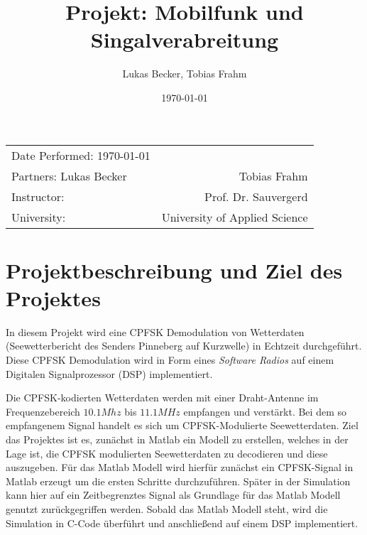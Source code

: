 \documentclass{article}
\title{Projekt: Mobilfunk und Singalverabreitung} %
\author{Lukas Becker, Tobias Frahm} %
\date{\today} %
\begin{document}
\maketitle %

\begin{center}
\begin{tabular}{l r}
Date Performed: \today \\ %
Partners: Lukas Becker & Tobias Frahm \\ %
Instructor: & Prof. Dr. Sauvergerd \\%
University: & University of Applied Science 
\end{tabular}
\end{center}

\begin{acronym}
\end{acronym}



\section{Projektbeschreibung und Ziel des Projektes}

In diesem Projekt wird eine \ac{CPFSK} Demodulation von Wetterdaten 
(Seewetterbericht des  Senders  Pinneberg  auf  Kurzwelle)  in  Echtzeit  durchgeführt. 
Diese  \ac{CPFSK} Demodulation  wird  in  Form  eines  \textit{Software  Radios}  auf  einem  
Digitalen Signalprozessor (DSP) implementiert. 

Die \ac{CPFSK}-kodierten Wetterdaten werden mit einer Draht-Antenne im Frequenzebereich
$10.1Mhz$ bis $11.1MHz$ empfangen und verstärkt. Bei dem so empfangenem Signal handelt es sich um 
\ac{CPFSK}-Modulierte Seewetterdaten. Ziel das Projektes ist es, zunächst in Matlab ein Modell zu erstellen, welches
in der Lage ist, die \ac{CPFSK} modulierten Seewetterdaten zu decodieren und diese auszugeben. 
Für das Matlab Modell wird hierfür zunächst ein \ac{CPFSK}-Signal in Matlab erzeugt um die ersten 
Schritte durchzuführen. Später in der Simulation kann hier auf ein Zeitbegrenztes Signal 
als Grundlage für das Matlab Modell genutzt zurückgegriffen werden. 
Sobald das Matlab Modell steht, wird die Simulation in C-Code überführt und anschließend 
auf einem DSP implementiert.
\end{document}
